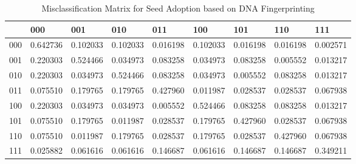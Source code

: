 \begin{table}
\caption{Misclassification Matrix for Seed Adoption based on DNA Fingerprinting}
\label{tab:cm}
\begin{tabular}{lllllllll}
\toprule
 & 000 & 001 & 010 & 011 & 100 & 101 & 110 & 111 \\
\midrule
000 & 0.642736 & 0.102033 & 0.102033 & 0.016198 & 0.102033 & 0.016198 & 0.016198 & 0.002571 \\
001 & 0.220303 & 0.524466 & 0.034973 & 0.083258 & 0.034973 & 0.083258 & 0.005552 & 0.013217 \\
010 & 0.220303 & 0.034973 & 0.524466 & 0.083258 & 0.034973 & 0.005552 & 0.083258 & 0.013217 \\
011 & 0.075510 & 0.179765 & 0.179765 & 0.427960 & 0.011987 & 0.028537 & 0.028537 & 0.067938 \\
100 & 0.220303 & 0.034973 & 0.034973 & 0.005552 & 0.524466 & 0.083258 & 0.083258 & 0.013217 \\
101 & 0.075510 & 0.179765 & 0.011987 & 0.028537 & 0.179765 & 0.427960 & 0.028537 & 0.067938 \\
110 & 0.075510 & 0.011987 & 0.179765 & 0.028537 & 0.179765 & 0.028537 & 0.427960 & 0.067938 \\
111 & 0.025882 & 0.061616 & 0.061616 & 0.146687 & 0.061616 & 0.146687 & 0.146687 & 0.349211 \\
\bottomrule
\end{tabular}
\end{table}

